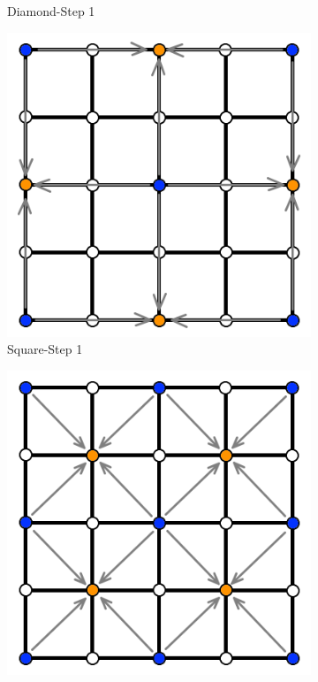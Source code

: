 \documentclass[11pt,a4paper,twoside,openright]{report}
\begin{document}
\begin{figure}[H]
\begin{subfigure}[b]{0.25\textwidth}
    \caption{Diamond-Step 1}
    \label{fig:ds2}
  \end{subfigure}
  \begin{subfigure}[b]{0.25\textwidth}
    \includegraphics[width=\textwidth]{ds3.png}
    \caption{Square-Step 1}
    \label{fig:ds3}
  \end{subfigure}
  \begin{subfigure}[b]{0.25\textwidth}
    \includegraphics[width=\textwidth]{ds4.png}

\end{subfigure}
\end{figure}
\end{document}
